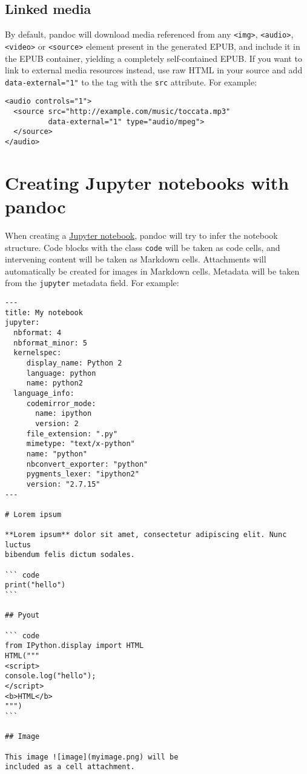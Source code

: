\documentclass[
]{article}
\begin{document}
\hypertarget{linked-media}{%
\subsection{Linked media}\label{linked-media}}

By default, pandoc will download media referenced from any
\texttt{\textless{}img\textgreater{}},
\texttt{\textless{}audio\textgreater{}},
\texttt{\textless{}video\textgreater{}} or
\texttt{\textless{}source\textgreater{}} element present in the
generated EPUB, and include it in the EPUB container, yielding a
completely self-contained EPUB. If you want to link to external media
resources instead, use raw HTML in your source and add
\texttt{data-external="1"} to the tag with the \texttt{src} attribute.
For example:

\begin{verbatim}
<audio controls="1">
  <source src="http://example.com/music/toccata.mp3"
          data-external="1" type="audio/mpeg">
  </source>
</audio>
\end{verbatim}

\hypertarget{creating-jupyter-notebooks-with-pandoc}{%
\section{Creating Jupyter notebooks with
pandoc}\label{creating-jupyter-notebooks-with-pandoc}}

When creating a
\href{https://nbformat.readthedocs.io/en/latest/}{Jupyter notebook},
pandoc will try to infer the notebook structure. Code blocks with the
class \texttt{code} will be taken as code cells, and intervening content
will be taken as Markdown cells. Attachments will automatically be
created for images in Markdown cells. Metadata will be taken from the
\texttt{jupyter} metadata field. For example:

\begin{verbatim}
---
title: My notebook
jupyter:
  nbformat: 4
  nbformat_minor: 5
  kernelspec:
     display_name: Python 2
     language: python
     name: python2
  language_info:
     codemirror_mode:
       name: ipython
       version: 2
     file_extension: ".py"
     mimetype: "text/x-python"
     name: "python"
     nbconvert_exporter: "python"
     pygments_lexer: "ipython2"
     version: "2.7.15"
---

# Lorem ipsum

**Lorem ipsum** dolor sit amet, consectetur adipiscing elit. Nunc luctus
bibendum felis dictum sodales.

``` code
print("hello")
```

## Pyout

``` code
from IPython.display import HTML
HTML("""
<script>
console.log("hello");
</script>
<b>HTML</b>
""")
```

## Image

This image ![image](myimage.png) will be
included as a cell attachment.
\end{verbatim}
\end{document}
